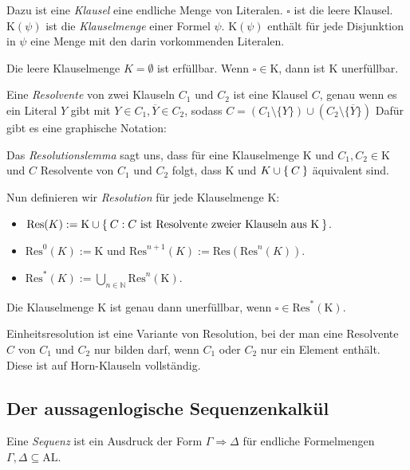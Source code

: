 \documentclass[a4paper,parskip=half*,DIV=15,fontsize=11pt]{scrartcl}
\newcommand{\AL}{\mathrm{AL}}
\newcommand{\Kl}{\mathrm{K}}
\newcommand{\Res}{\mathrm{Res}}
\begin{document}
Dazu ist eine \emph{Klausel} eine endliche Menge von Literalen. $\square$ ist die leere Klausel. $\Kl(\psi)$ ist die \emph{Klauselmenge} einer Formel $\psi$. $\Kl(\psi)$ enthält für jede Disjunktion in $\psi$ eine Menge mit den darin vorkommenden Literalen.

Die leere Klauselmenge $K = \emptyset$ ist erfüllbar. Wenn $\square \in \Kl$, dann ist $\Kl$ unerfüllbar.

Eine \emph{Resolvente} von zwei Klauseln $C_1$ und $C_2$ ist eine Klausel $C$, genau wenn es ein Literal $Y$ gibt mit $Y \in C_1, \overline{Y} \in C_2$, sodass $C = (C_1 \setminus \{Y\}) \cup (C_2 \setminus \{\overline{Y}\})$ Dafür gibt es eine graphische Notation:\\
\begin{center}
\end{center}

Das \emph{Resolutionslemma} sagt uns, dass für eine Klauselmenge $\Kl$ und $C_1, C_2 \in \Kl$ und $C$ Resolvente von $C_1$ und $C_2$ folgt, dass $\Kl$ und $K \cup \Set{C}$ äquivalent sind.

Nun definieren wir \emph{Resolution} für jede Klauselmenge $\Kl$:
\begin{itemize}
\item $\Res(K) := \Kl \cup \Set{C : C \textrm{ ist Resolvente zweier Klauseln aus } \Kl}$.
\item $\Res^0(K) := \Kl$ und $\Res^{n+1}(K) := \Res(\Res^n(K))$.
\item $\Res^\ast(K) := \bigcup_{n \in \mathbb{N}} \Res^n(\Kl)$.
\end{itemize}

Die Klauselmenge $\Kl$ ist genau dann unerfüllbar, wenn $\square \in \Res^\ast(\Kl)$.

Einheitsresolution ist eine Variante von Resolution, bei der man eine Resolvente $C$ von $C_1$ und $C_2$ nur bilden darf, wenn $C_1$ oder $C_2$ nur ein Element enthält. Diese ist auf Horn-Klauseln vollständig.

\subsection{Der aussagenlogische Sequenzenkalkül}

Eine \emph{Sequenz} ist ein Ausdruck der Form $\Gamma \Rightarrow \Delta$ für endliche Formelmengen $\Gamma, \Delta \subseteq \AL$.
\end{document}
